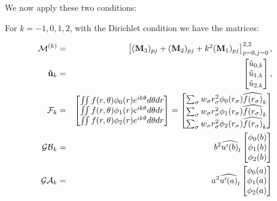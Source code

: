 We now apply these two conditions:

For $k = -1, 0, 1, 2$, with the Dirichlet condition we have the matrices:

\begin{eqnarray}
\mathcal{M}^{(k)} &=& \begin{bmatrix}
                        ({\bf M}_3)_{pj} + ({\bf M}_2)_{pj} + k^2 ({\bf M}_1)_{pj}
                  \end{bmatrix}_{p = 0, j = 0}^{2,2}, \\
\mathbf{\hat u}_k &=& \begin{bmatrix}
                        \hat u_{0,k} \\
                        \hat u_{1,k} \\
                        \hat u_{2,k} \\
                    \end{bmatrix},   \\
\mathcal{F}_k &=& \begin{bmatrix}
                        \iint f(r, \theta)\phi_0(r)e^{ik\theta}d\theta dr \\
                        \iint f(r, \theta)\phi_1(r)e^{ik\theta}d\theta dr \\
                        \iint f(r, \theta)\phi_2(r)e^{ik\theta}d\theta dr \\
                    \end{bmatrix}
               =  \begin{bmatrix}
                        \sum_\sigma w_\sigma r_\sigma^2\phi_0(r_\sigma) \widehat{f(r_\sigma)}_k \\
                        \sum_\sigma w_\sigma r_\sigma^2\phi_1(r_\sigma) \widehat{f(r_\sigma)}_k \\
                        \sum_\sigma w_\sigma r_\sigma^2\phi_2(r_\sigma) \widehat{f(r_\sigma)}_k \\
                    \end{bmatrix}\\
\mathcal{GB}_k &=& b^2  \widehat{u^\prime(b)}_l
                    \begin{bmatrix}
                        \phi_0(b)\\
                        \phi_1(b)\\
                        \phi_2(b)\\
                    \end{bmatrix} \\
\mathcal{GA}_k &=& a^2  \widehat{u^\prime(a)}_l
                    \begin{bmatrix}
                        \phi_0(a)\\
                        \phi_1(a)\\
                        \phi_2(a)\\
                    \end{bmatrix} \\
\end{eqnarray}

